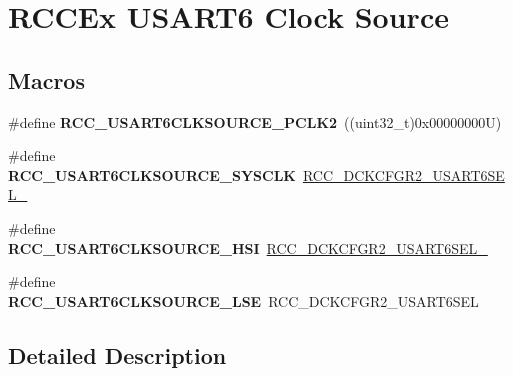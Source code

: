 \hypertarget{group___r_c_c_ex___u_s_a_r_t6___clock___source}{}\section{R\+C\+C\+Ex U\+S\+A\+R\+T6 Clock Source}
\label{group___r_c_c_ex___u_s_a_r_t6___clock___source}
\subsection*{Macros}
\begin{DoxyCompactItemize}
\item 
\mbox{\label{group___r_c_c_ex___u_s_a_r_t6___clock___source_ga63551599c74fbf7b99590526121cdf45}} 
\#define {\bfseries R\+C\+C\+\_\+\+U\+S\+A\+R\+T6\+C\+L\+K\+S\+O\+U\+R\+C\+E\+\_\+\+P\+C\+L\+K2}~((uint32\+\_\+t)0x00000000\+U)
\item 
\mbox{\label{group___r_c_c_ex___u_s_a_r_t6___clock___source_gaf442599bb922ccecc5bbca84f6395871}} 
\#define {\bfseries R\+C\+C\+\_\+\+U\+S\+A\+R\+T6\+C\+L\+K\+S\+O\+U\+R\+C\+E\+\_\+\+S\+Y\+S\+C\+LK}~\mbox{\hyperlink{group___peripheral___registers___bits___definition_gafba742338e89a08ea4e06fb378a092b5}{R\+C\+C\+\_\+\+D\+C\+K\+C\+F\+G\+R2\+\_\+\+U\+S\+A\+R\+T6\+S\+E\+L\+\_}}
\item 
\mbox{\label{group___r_c_c_ex___u_s_a_r_t6___clock___source_ga23a3c393f53c54bfda6344a0105437e0}} 
\#define {\bfseries R\+C\+C\+\_\+\+U\+S\+A\+R\+T6\+C\+L\+K\+S\+O\+U\+R\+C\+E\+\_\+\+H\+SI}~\mbox{\hyperlink{group___peripheral___registers___bits___definition_gafe4f0c2a8bb6de3bed24b88bc68c8ea9}{R\+C\+C\+\_\+\+D\+C\+K\+C\+F\+G\+R2\+\_\+\+U\+S\+A\+R\+T6\+S\+E\+L\+\_}}
\item 
\mbox{\label{group___r_c_c_ex___u_s_a_r_t6___clock___source_gad1c7cb7a9b496f577bc87bda61534313}} 
\#define {\bfseries R\+C\+C\+\_\+\+U\+S\+A\+R\+T6\+C\+L\+K\+S\+O\+U\+R\+C\+E\+\_\+\+L\+SE}~R\+C\+C\+\_\+\+D\+C\+K\+C\+F\+G\+R2\+\_\+\+U\+S\+A\+R\+T6\+S\+EL
\end{DoxyCompactItemize}


\subsection{Detailed Description}
